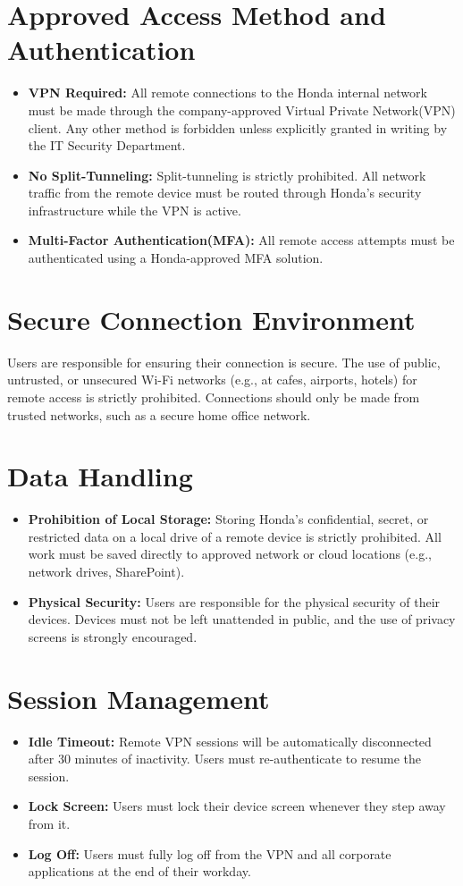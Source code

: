\section{Approved Access Method and Authentication}
\begin{itemize}
    \item \textbf{VPN Required:} All remote connections to the Honda internal network must be made through the company-approved Virtual Private Network(VPN) client. Any other method is forbidden unless explicitly granted in writing by the IT Security Department.
    \item \textbf{No Split-Tunneling:} Split-tunneling is strictly prohibited. All network traffic from the remote device must be routed through Honda's security infrastructure while the VPN is active.
    \item \textbf{Multi-Factor Authentication(MFA):} All remote access attempts must be authenticated using a Honda-approved MFA solution.
\end{itemize}

\section{Secure Connection Environment}
Users are responsible for ensuring their connection is secure. The use of public, untrusted, or unsecured Wi-Fi networks (e.g., at cafes, airports, hotels) for remote access is strictly prohibited. Connections should only be made from trusted networks, such as a secure home office network.

\section{Data Handling}
\begin{itemize}
    \item \textbf{Prohibition of Local Storage:} Storing Honda's confidential, secret, or restricted data on a local drive of a remote device is strictly prohibited. All work must be saved directly to approved network or cloud locations (e.g., network drives, SharePoint).
    \item \textbf{Physical Security:} Users are responsible for the physical security of their devices. Devices must not be left unattended in public, and the use of privacy screens is strongly encouraged.
\end{itemize}

\section{Session Management}
\begin{itemize}
    \item \textbf{Idle Timeout:} Remote VPN sessions will be automatically disconnected after 30 minutes of inactivity. Users must re-authenticate to resume the session.
    \item \textbf{Lock Screen:} Users must lock their device screen whenever they step away from it.
    \item \textbf{Log Off:} Users must fully log off from the VPN and all corporate applications at the end of their workday.
\end{itemize}
